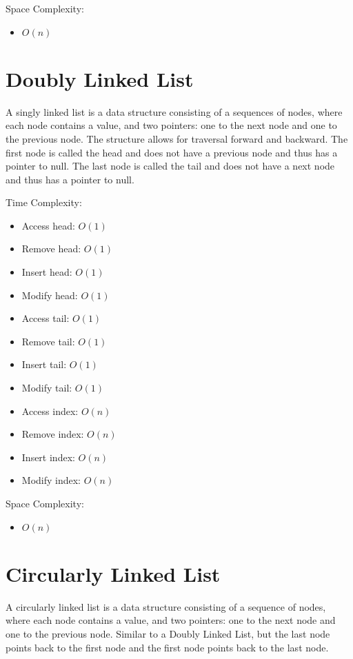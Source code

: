 Space Complexity:

\begin{itemize}
    \item $O(n)$
\end{itemize}

\section{Doubly Linked List}
A singly linked list is a data structure consisting of a sequences of nodes, where each node contains a value, and two pointers: one to the next node and one to the previous node. The structure allows for traversal forward and backward. The first node is called the head and does not have a previous node and thus has a pointer to null. The last node is called the tail and does not have a next node and thus has a pointer to null.

Time Complexity:
\begin{itemize}
    \item Access head: $O(1)$
    \item Remove head: $O(1)$
    \item Insert head: $O(1)$
    \item Modify head: $O(1)$
    \item Access tail: $O(1)$
    \item Remove tail: $O(1)$
    \item Insert tail: $O(1)$
    \item Modify tail: $O(1)$
    \item Access index: $O(n)$
    \item Remove index: $O(n)$
    \item Insert index: $O(n)$
    \item Modify index: $O(n)$
\end{itemize}

Space Complexity:

\begin{itemize}
    \item $O(n)$
\end{itemize}

\section{Circularly Linked List}
A circularly linked list is a data structure consisting of a sequence of nodes, where each node contains a value, and two pointers: one to the next node and one to the previous node. Similar to a Doubly Linked List, but the last node points back to the first node and the first node points back to the last node.

